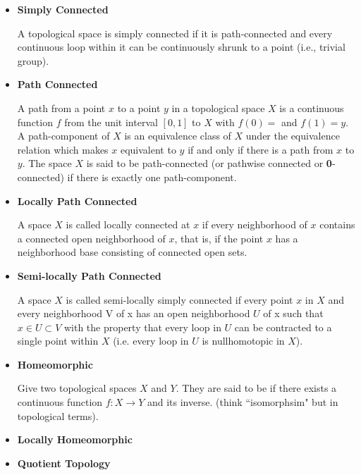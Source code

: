 \documentclass[12pt,a4paper]{report}
\begin{document}
\begin{description}
\begin{itemize}
		A topological space $X$ is said to be \textit{disconnected} if it is the union of two disjoint non-empty open sets. Otherwise, $X$ is said to be 
		
		\item \textbf{Simply Connected}

		A topological space is simply connected if it is path-connected and every continuous loop within it can be continuously shrunk to a point (i.e., trivial group).
		
		\item \textbf{Path Connected}
		
		 A path from a point $x$ to a point $y$ in a topological space 
$X$ is a continuous function 
$f$ from the unit interval $[0,1]$ to $X$ with $f(0)=$ and $f(1)=y$. A path-component of $X$ is an equivalence class of $X$ under the equivalence relation which makes $x$ equivalent to $y$ if and only if there is a path from $x$ to $y$. The space $X$ is said to be path-connected (or pathwise connected or \textbf{0}-connected) if there is exactly one path-component.

		\item \textbf{Locally Path Connected}
		
		A space $X$ is called locally connected at $x$ if every neighborhood of $x$ contains a connected open neighborhood of $x$, that is, if the point $x$ has a neighborhood base consisting of connected open sets.
		
		\item \textbf{Semi-locally Path Connected}
		
		A space $X$ is called semi-locally simply connected if every point $x$ in $X$ and every neighborhood V of x has an open neighborhood $U$ of x such that $x\in U\subset V$ with the property that every loop in $U$ can be contracted to a single point within $X$ (i.e. every loop in $U$ is nullhomotopic in $X$).
		
		\item \textbf{Homeomorphic}
		
		Give two topological spaces $X$ and $Y$.  They are said to be  if there exists a continuous function $f: X \to Y$ and its inverse. (think ``isomorphsim" but in topological terms).
		
		\item \textbf{Locally Homeomorphic}
		
		\item \textbf{Quotient Topology}
	\end{itemize}


\end{description}
\end{document}
